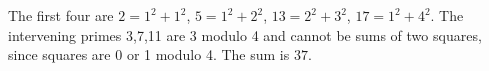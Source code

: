 The first four are $2=1^2+1^2$, $5=1^2+2^2$, $13=2^2+3^2$, $17=1^2+4^2$. The intervening primes 3,7,11 are 3 modulo 4 and cannot be sums of two squares, since squares are 0 or 1 modulo 4. The sum is $\boxed{37}$.
